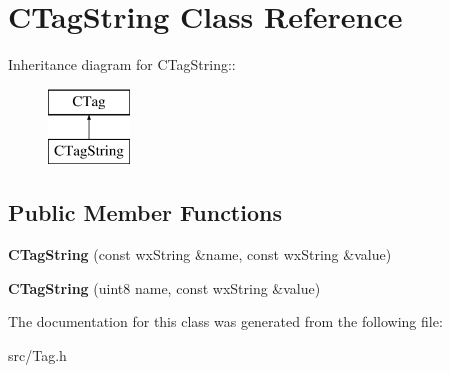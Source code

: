 \section{CTagString Class Reference}
\label{classCTagString}
Inheritance diagram for CTagString::\begin{figure}[H]
\begin{center}
\leavevmode
\includegraphics[height=2cm]{classCTagString}
\end{center}
\end{figure}
\subsection*{Public Member Functions}
\begin{DoxyCompactItemize}
\item 
{\bfseries CTagString} (const wxString \&name, const wxString \&value)\label{classCTagString_a1818b416945ed4c3dd5dc653088955d6}

\item 
{\bfseries CTagString} (uint8 name, const wxString \&value)\label{classCTagString_a6067d173e22fb77e6c63ca97f8a7972a}

\end{DoxyCompactItemize}


The documentation for this class was generated from the following file:\begin{DoxyCompactItemize}
\item 
src/Tag.h\end{DoxyCompactItemize}
